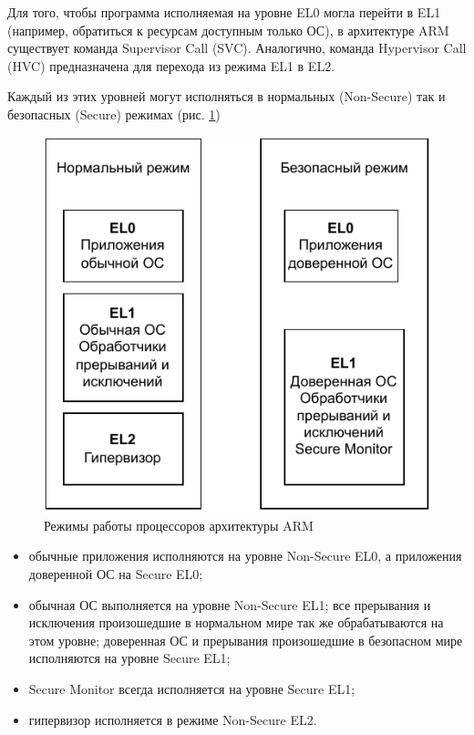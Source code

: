 Для того, чтобы программа исполняемая на уровне EL0 могла перейти в EL1 (например, обратиться к ресурсам доступным только ОС), в архитектуре ARM существует команда Supervisor Call (SVC). Аналогично, команда Hypervisor Call (HVC) предназначена для перехода из режима EL1 в EL2.

Каждый из этих уровней могут исполняться в нормальных (Non-Secure) так и безопасных (Secure) режимах (рис. \ref{fig:arm-levels})

\begin{figure}[h]
	\centering
	\includegraphics[width=\textwidth]{img/arm-levels.pdf}
	\caption{Режимы работы процессоров архитектуры ARM}
	\label{fig:arm-levels}
\end{figure}

\begin{itemize}
	\item обычные приложения исполняются на уровне Non-Secure EL0, а приложения доверенной ОС на Secure EL0;
	\item обычная ОС выполняется на уровне Non-Secure EL1; все прерывания и исключения произошедшие в нормальном мире так же обрабатываются на этом уровне; доверенная ОС и прерывания произошедшие в безопасном мире исполняются на уровне Secure EL1;
	\item Secure Monitor всегда исполняется на уровне Secure EL1;
	\item гипервизор исполняется в режиме Non-Secure EL2.
\end{itemize}

